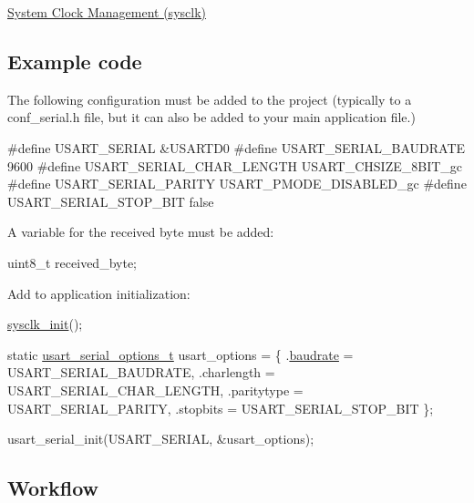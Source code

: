\begin{DoxyEnumerate}
\item \hyperlink{group__sysclk__group}{System Clock Management (sysclk)}
\end{DoxyEnumerate}\hypertarget{serial_quickstart_serial_basic_use_case_setup_code}{}\subsection{Example code}\label{serial_quickstart_serial_basic_use_case_setup_code}
The following configuration must be added to the project (typically to a conf\-\_\-serial.\-h file, but it can also be added to your main application file.) 
\begin{DoxyCode}
\textcolor{preprocessor}{        #define USART\_SERIAL                     &USARTD0}
\textcolor{preprocessor}{}\textcolor{preprocessor}{        #define USART\_SERIAL\_BAUDRATE            9600}
\textcolor{preprocessor}{}\textcolor{preprocessor}{        #define USART\_SERIAL\_CHAR\_LENGTH         USART\_CHSIZE\_8BIT\_gc}
\textcolor{preprocessor}{}\textcolor{preprocessor}{        #define USART\_SERIAL\_PARITY              USART\_PMODE\_DISABLED\_gc}
\textcolor{preprocessor}{        #define USART\_SERIAL\_STOP\_BIT            false}
\end{DoxyCode}


A variable for the received byte must be added\-: 
\begin{DoxyCode}
 uint8\_t received\_byte; 
\end{DoxyCode}


Add to application initialization\-: 
\begin{DoxyCode}
            \hyperlink{group__sysclk__group_ga242399e48a97739c88b4d0c00f6101de}{sysclk\_init}();

            \textcolor{keyword}{static} \hyperlink{structusart__rs232__options}{usart\_serial\_options\_t} usart\_options =
       \{
               .\hyperlink{structusart__rs232__options_a2c48c35d680d4805d357677d7d352fd0}{baudrate} = USART\_SERIAL\_BAUDRATE,
               .charlength = USART\_SERIAL\_CHAR\_LENGTH,
               .paritytype = USART\_SERIAL\_PARITY,
               .stopbits = USART\_SERIAL\_STOP\_BIT
            \};

            usart\_serial\_init(USART\_SERIAL, &usart\_options);
\end{DoxyCode}
\hypertarget{serial_quickstart_serial_basic_use_case_setup_flow}{}\subsection{Workflow}\label{serial_quickstart_serial_basic_use_case_setup_flow}

